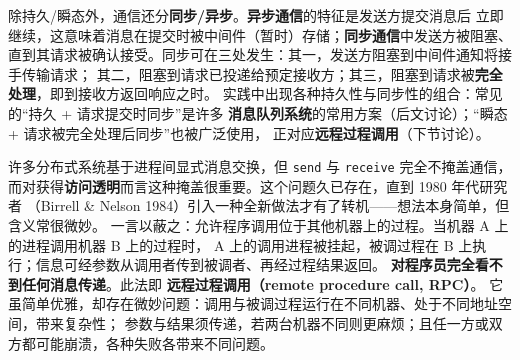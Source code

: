 \medskip\noindent 除持久/瞬态外，通信还分\textbf{同步/异步}。\textbf{异步通信}的特征是发送方提交消息后
立即继续，这意味着消息在提交时被中间件（暂时）存储；\textbf{同步通信}中发送方被阻塞、
直到其请求被确认接受。同步可在三处发生：其一，发送方阻塞到中间件通知将接手传输请求；
其二，阻塞到请求已投递给预定接收方；其三，阻塞到请求被\textbf{完全处理}，即到接收方返回响应之时。
实践中出现各种持久性与同步性的组合：常见的“持久 + 请求提交时同步”是许多
\textbf{消息队列系统}的常用方案（后文讨论）；“瞬态 + 请求被完全处理后同步”也被广泛使用，
正对应\textbf{远程过程调用}（下节讨论）。

\begin{closeread}
\end{closeread}



许多分布式系统基于进程间显式消息交换，但 \texttt{send} 与 \texttt{receive} 完全不掩盖通信，
而对获得\textbf{访问透明}而言这种掩盖很重要。这个问题久已存在，直到 1980 年代研究者
（Birrell \& Nelson 1984）引入一种全新做法才有了转机——想法本身简单，但含义常很微妙。
一言以蔽之：允许程序调用位于其他机器上的过程。当机器 A 上的进程调用机器 B 上的过程时，
A 上的调用进程被挂起，被调过程在 B 上执行；信息可经参数从调用者传到被调者、再经过程结果返回。
\textbf{对程序员完全看不到任何消息传递}。此法即 \textbf{远程过程调用（remote procedure call, RPC）}。
它虽简单优雅，却存在微妙问题：调用与被调过程运行在不同机器、处于不同地址空间，带来复杂性；
参数与结果须传递，若两台机器不同则更麻烦；且任一方或双方都可能崩溃，各种失败各带来不同问题。

